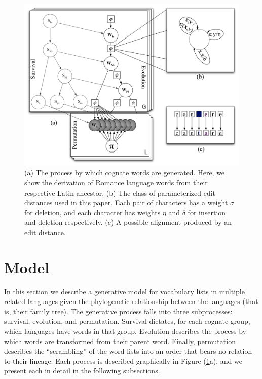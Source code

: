 \documentclass[11pt,a4paper]{article}
\begin{document}
\begin{figure}
  \centering
  \includegraphics[scale=0.4]{gmodel}
  \caption{(a) The process by which cognate words are generated.
  Here, we show the derivation of Romance language words from their
  respective Latin ancestor. (b) The class of parameterized edit
  distances used in this paper. Each pair of characters has a weight
  $\sigma$ for deletion, and each character has weights $\eta$ and
  $\delta$ for insertion and deletion respectively. (c) A possible
  alignment produced by an edit distance.}

  \label{fig:gmodel}
\end{figure}

\section{Model}

In this section we describe a generative model for vocabulary lists
in multiple related languages given the phylogenetic relationship
between the languages (that is, their family tree). The generative
process falls into three subprocesses: survival, evolution, and
permutation. Survival dictates, for each cognate group, which
languages have words in that group. Evolution describes the process
by which words are transformed from their parent word. Finally,
permutation describes the ``scrambling'' of the word lists into an
order that bears no relation to their lineage. Each process is
described graphically in Figure (\ref{fig:gmodel}a), and we present
each in detail in the following subsections.
\end{document}
